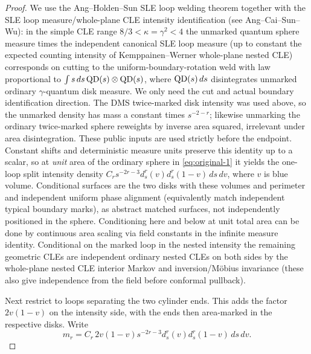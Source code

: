 \begin{proof}\leavevmode


We use the Ang--Holden--Sun SLE loop welding theorem together with the SLE loop measure/whole-plane CLE intensity identification (see Ang--Cai--Sun--Wu): in the simple CLE range \(8/3<\kappa=\gamma^2<4\) the unmarked quantum sphere measure times the independent canonical SLE loop measure (up to constant the expected counting intensity of Kemppainen--Werner whole-plane nested CLE) corresponds on cutting to the uniform-boundary-rotation weld with law proportional to \(\int s\,ds\,{\rm QD}(s)\otimes{\rm QD}(s)\), where \({\rm QD}(s)\,ds\) disintegrates unmarked ordinary \(\gamma\)-quantum disk measure.
We only need the cut and actual boundary identification direction.
The DMS twice-marked disk intensity was used above, so the unmarked density has mass a constant times \(s^{-2-r}\); likewise unmarking the ordinary twice-marked sphere reweights by inverse area squared, irrelevant under area disintegration.
These public inputs are used strictly before the endpoint.
Constant shifts and deterministic measure units preserve this identity up to a scalar, so at \emph{unit} area of the ordinary sphere in \eqref{eq:original-1} it yields the one-loop split intensity density \(C_r s^{-2r-3}d_s^r(v)d_s^r(1-v)\,ds\,dv\), where \(v\) is blue volume.
Conditional surfaces are the two disks with these volumes and perimeter and independent uniform phase alignment (equivalently match independent typical boundary marks), as abstract matched surfaces, not independently positioned in the sphere.
Conditioning here and below at unit total area can be done by continuous area scaling via field constants in the infinite measure identity.
Conditional on the marked loop in the nested intensity the remaining geometric CLEs are independent ordinary nested CLEs on both sides by the whole-plane nested CLE interior Markov and inversion/Möbius invariance (these also give independence from the field before conformal pullback). \citep[Theorem~1.1]{AHSwelding}\citep[Theorem~7.1 and Proposition~7.2]{ACSWloops}

Next restrict to loops separating the two cylinder ends. This adds the factor \(2v(1-v)\) on the intensity side, with the ends then area-marked in the respective disks. Write
\[
 m_r=C_r\,2v(1-v)s^{-2r-3}d_s^r(v)d_s^r(1-v)\,ds\,dv .
\]



\end{proof}
